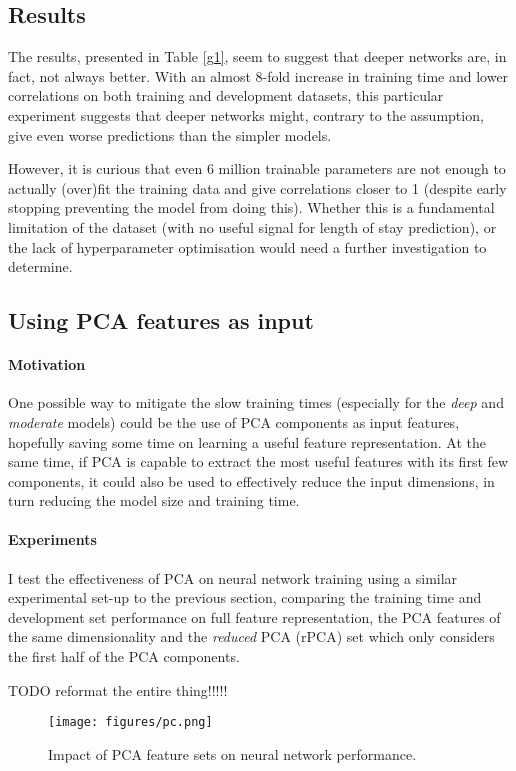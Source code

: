 \documentclass[10pt, twocolumn]{article}
\begin{document}
\subsection{Results}
The results, presented in Table \ref{g1}, seem to suggest that deeper networks are, in fact, not always better. With an almost 8-fold increase in training time and lower correlations on both training and development datasets, this particular experiment suggests that deeper networks might, contrary to the assumption, give even worse predictions than the simpler models. 

However, it is curious that even 6 million trainable parameters are not enough to actually (over)fit the training data and give correlations closer to 1 (despite early stopping preventing the model from doing this). Whether this is a fundamental limitation of the dataset (with no useful signal for length of stay prediction), or the lack of hyperparameter optimisation would need a further investigation to determine.

\subsection{Using PCA features as input}
\paragraph{Motivation} One possible way to mitigate the slow training times (especially for the \textit{deep} and \textit{moderate} models) could be the use of PCA components as input features, hopefully saving some time on learning a useful feature representation. At the same time, if PCA is capable to extract the most useful features with its first few components, it could also be used to effectively reduce the input dimensions, in turn reducing the model size and training time. 

\paragraph{Experiments} I test the effectiveness of PCA on neural network training using a similar experimental set-up to the previous section, comparing the training time and development set performance on full feature representation, the PCA features of the same dimensionality and the \textit{reduced} PCA (rPCA) set which only considers the first half of the PCA components. 

TODO reformat the entire thing!!!!! 
\begin{figure*}[htb!]
	\centering
	\texttt{[image: figures/pc.png]}
	\caption{Impact of PCA feature sets on neural network performance.}\label{pca}
\end{figure*}
\end{document}
